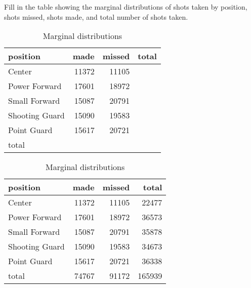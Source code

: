 \documentclass[letterpaper]{exam}
\begin{document}
\begin{questions}
\begin{solution}
        \end{solution}
      \question[5] Fill in the table showing the marginal distributions of shots
      taken by position, shots missed, shots made, and total number of shots
      taken.

      \ifprintanswers{}
      \else
        \begin{table}[H]
          \centering
          \begin{tabular}{lrrr}
            \toprule
            position       & made  & missed & total \\
            \midrule
            Center         & 11372 & 11105  &       \\
            Power Forward  & 17601 & 18972  &       \\
            Small Forward  & 15087 & 20791  &       \\
            Shooting Guard & 15090 & 19583  &       \\
            Point Guard    & 15617 & 20721  &       \\
            \midrule
            total          &       &        &        \\
            \bottomrule
          \end{tabular}
          \caption{Marginal distributions}\label{tab:marginal_shots}
        \end{table}
      \fi

      \begin{solution}
        
        \begin{table}[H]
          \centering
          \begin{tabular}{lrrr}
            \toprule
            position       & made  & missed & total \\
            \midrule
            Center         & 11372 & 11105  & 22477 \\
            Power Forward  & 17601 & 18972  & 36573 \\
            Small Forward  & 15087 & 20791  & 35878 \\
            Shooting Guard & 15090 & 19583 & 34673 \\
            Point Guard    & 15617 & 20721 & 36338 \\
            \midrule
            total          & 74767 & 91172 & 165939 \\
            \bottomrule
          \end{tabular}
          \caption{Marginal distributions}\label{tab:marginal_shots}
        \end{table}


\end{solution}
\end{questions}
\end{document}
